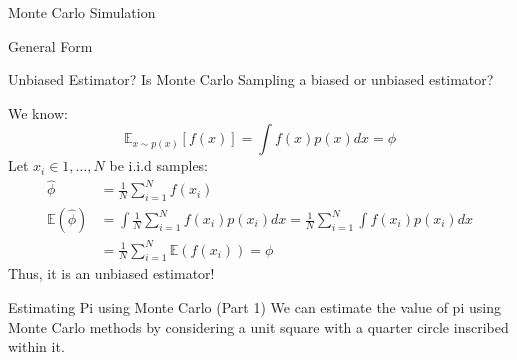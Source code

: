 \documentclass{beamer}
\begin{document}
\begin{section}{Monte Carlo Simulation}
\begin{frame}{General Form}
    \end{frame}

        


    \begin{frame}{Unbiased Estimator?}
        Is Monte Carlo Sampling a biased or unbiased estimator?

        We know:
        \begin{equation}
            \mathbb{E}_{x \sim p(x)}[f(x)] = \int f(x) p(x) dx = \phi
        \end{equation}
        Let $x_i\in 1, \ldots, N$ be i.i.d samples:
        \begin{align*}
            \hat{\phi} &= \frac{1}{N} \sum_{i=1}^{N} f(x_i) \\
            \mathbb{E}(\hat{\phi}) &= \int \frac{1}{N} \sum_{i=1}^{N} f(x_i)p(x_i)dx = \frac{1}{N}\sum_{i=1}^{N} \int f(x_i)p(x_i)dx \\
            &= \frac{1}{N}\sum_{i=1}^N\mathbb{E}(f(x_i)) = \phi
        \end{align*}
        Thus, it is an unbiased estimator!
    \end{frame}

    \begin{frame}[fragile]{Estimating Pi using Monte Carlo (Part 1)}
        We can estimate the value of pi using Monte Carlo methods by considering a unit square with a quarter circle inscribed within it.
        

\end{frame}
\end{section}
\end{document}
